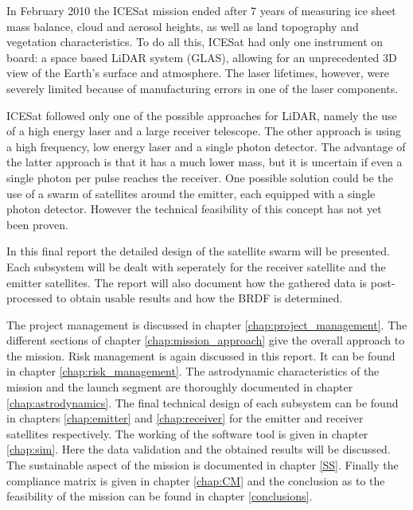 In February 2010 the ICESat mission ended after 7 years of measuring ice sheet mass balance, cloud and aerosol heights, as well as land topography and vegetation characteristics.
To do all this, ICESat had only one instrument on board: a space based \ac{LiDAR} system (\ac{GLAS}), allowing for an unprecedented 3D view of the Earth's surface and atmosphere.
The laser lifetimes, however, were severely limited because of manufacturing errors in one of the laser components.

ICESat followed only one of the possible approaches for \ac{LiDAR}, namely the use of a high energy laser and a large receiver telescope. The other approach is using a high frequency, low energy laser and a single photon detector. The advantage of the latter approach is that it has a much lower mass, but it is uncertain if even a single photon per pulse reaches the receiver. One possible solution could be the use of a swarm of satellites around the emitter, each equipped with a single photon detector. However the technical feasibility of this concept has not yet been proven.

In this final report the detailed design of the satellite swarm will be presented. Each subsystem will be dealt with seperately for the receiver satellite and the emitter satellites. The report will also document how the gathered data is post-processed to obtain usable results and how the BRDF is determined.

The project management is discussed in chapter \ref{chap:project_management}. The different sections of chapter \ref{chap:mission_approach} give the overall approach to the mission. Risk management is again discussed in this report. It can be found in chapter \ref{chap:risk_management}. The astrodynamic characteristics of the mission and the launch segment are thoroughly documented in chapter \ref{chap:astrodynamics}. The final technical design of each subsystem can be found in chapters \ref{chap:emitter} and \ref{chap:receiver} for the emitter and receiver satellites respectively.
The working of the software tool is given in chapter \ref{chap:sim}. Here the data validation and the obtained results will be discussed. The sustainable aspect of the mission is documented in chapter \ref{SS}. 
Finally the compliance matrix is given in chapter \ref{chap:CM} and the conclusion as to the feasibility of the mission can be found in chapter \ref{conclusions}.